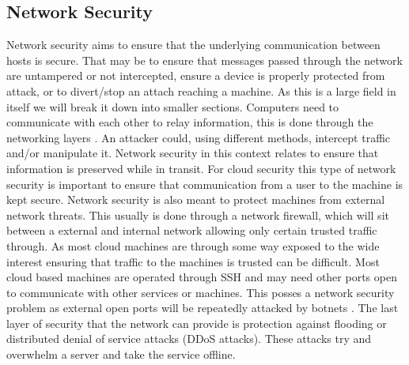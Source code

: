 \documentclass[12pt]{article}
\begin{document}
\subsection{Network Security}
Network security aims to ensure that the underlying communication between hosts is secure. That may be to ensure that messages passed through the network are untampered or not intercepted, ensure a device is properly protected from attack, or to divert/stop an attach reaching a machine. As this is a large field in itself we will break it down into smaller sections. Computers need to communicate with each other to relay information, this is done through the networking layers \cite{briscoe2000understanding}. An attacker could, using different methods, intercept traffic and/or manipulate it. Network security in this context relates to ensure that information is preserved while in transit. For cloud security this type of network security is important to ensure that communication from a user to the machine is kept secure. Network security is also meant to protect machines from external network threats. This usually is done through a network firewall, which will sit between a external and internal network allowing only certain trusted traffic through. As most cloud machines are through some way exposed to the wide interest ensuring that traffic to the machines is trusted can be difficult. Most cloud based machines are operated through SSH and may need other ports open to communicate with other services or machines. This posses a network security problem as external open ports will be repeatedly attacked by botnets \cite{cooke2005zombie}. The last layer of security that the network can provide is protection against flooding or distributed denial of service attacks (DDoS attacks). These attacks try and overwhelm a server and take the service offline.
\end{document}
